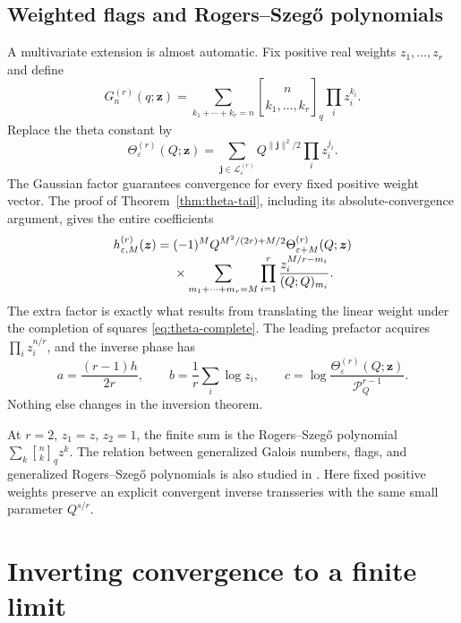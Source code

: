 \documentclass[11pt]{article}
\numberwithin{equation}{section}
\theoremstyle{definition}
\newcommand{\qbin}[2]{\genfrac{[}{]}{0pt}{}{#1}{#2}_{q}}
\newcommand{\pp}[1]{(Q;Q)_{#1}}
\newcommand{\Pinf}{\mathcal P_Q}
\newcommand{\eps}{\varepsilon}
\newcommand{\T}{\Theta}
\begin{document}
\subsection{Weighted flags and Rogers--Szeg\H{o} polynomials}
\label{sec:weighted-Galois}

A multivariate extension is almost automatic. Fix positive real weights $z_1,\ldots,z_r$ and define
\begin{equation}\label{eq:weightedGalois}
 G_n^{(r)}(q;\boldsymbol z)=
 \sum_{k_1+\cdots+k_r=n}
 \genfrac{[}{]}{0pt}{}{n}{k_1,\ldots,k_r}_q
 \prod_i z_i^{k_i}.
\end{equation}
Replace the theta constant by
\begin{equation}\label{eq:weightedtheta}
 \T_{\eps}^{(r)}(Q;\boldsymbol z)=
 \sum_{\boldsymbol j\in\mathcal L_{\eps}^{(r)}}
 Q^{\|\boldsymbol j\|^2/2}\prod_i z_i^{j_i}.
\end{equation}
The Gaussian factor guarantees convergence for every fixed positive weight vector. The proof of Theorem~\ref{thm:theta-tail}, including its absolute-convergence argument, gives the entire coefficients
\begin{align}\label{eq:weightedh}
 h_{\eps,M}^{(r)}(\boldsymbol z)
 ={}&(-1)^M Q^{M^2/(2r)+M/2}
       \T_{\eps+M}^{(r)}(Q;\boldsymbol z)\\[-0.3em]
 &\times\sum_{m_1+\cdots+m_r=M}
       \prod_{i=1}^r\frac{z_i^{M/r-m_i}}{\pp{m_i}}.\notag
\end{align}
The extra factor is exactly what results from translating the linear weight under the completion of squares \eqref{eq:theta-complete}. The leading prefactor acquires
$\prod_i z_i^{n/r}$, and the inverse phase has
\begin{equation}\label{eq:weightedphase}
 a=\frac{(r-1)h}{2r},\qquad
 b=\frac1r\sum_i\log z_i,\qquad
 c=\log\frac{\T_{\eps}^{(r)}(Q;\boldsymbol z)}{\Pinf^{r-1}}.
\end{equation}
Nothing else changes in the inversion theorem.

At $r=2$, $z_1=z$, $z_2=1$, the finite sum is the Rogers--Szeg\H{o} polynomial
$\sum_k\qbin{n}{k}z^k$. The relation between generalized Galois numbers, flags, and generalized Rogers--Szeg\H{o} polynomials is also studied in \cite{bliem}. Here fixed positive weights preserve an explicit convergent inverse transseries with the same small parameter $Q^{s/r}$.

\section{Inverting convergence to a finite limit}
\label{sec:endpoint}
\end{document}
